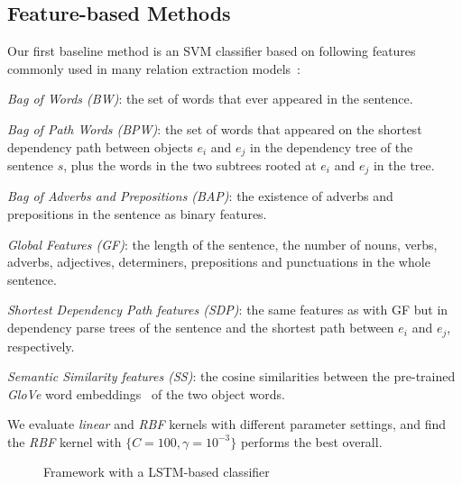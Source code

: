 \subsection{Feature-based Methods}
\label{sec:feature}
Our first baseline method is an SVM classifier based on following features commonly used in many relation extraction models~\cite{xu2015classifying}: 
\begin{compactenum}
	\item  \textit{Bag of Words (BW)}:
	the set of words that ever appeared in the sentence. 
	\item \textit{Bag of Path Words (BPW)}:
	the set of words that appeared on
	the shortest dependency path between objects $e_i$ and $e_j$ in the 
	dependency tree of the sentence $s$, plus the words in the two subtrees 
	rooted at $e_i$ and $e_j$ in the tree.
	\item \textit{Bag of Adverbs and Prepositions (BAP)}:
	the existence of adverbs and prepositions in the sentence as binary features. 
	\item \textit{Global Features (GF)}:
	the length of the sentence, the number of nouns, verbs, adverbs, adjectives, determiners, prepositions and punctuations in the whole sentence. 
	\item \textit{Shortest Dependency Path features (SDP)}:
	the same features as with GF but in dependency parse trees of the sentence and the shortest path 
	between $e_i$ and $e_j$, respectively. 
	\item \textit{Semantic Similarity features (SS)}:
	the cosine similarities between the pre-trained \textit{GloVe} word embeddings~\cite{pennington2014glove} of the two object words.
\end{compactenum}
We evaluate \textit{linear} and \textit{RBF} kernels with different parameter settings, and find the \textit{RBF} kernel with $\{C=100, \gamma=10^{-3}\}$ performs the best overall.

\begin{figure*}[t]
	\centering
	\caption{Framework with a LSTM-based classifier}
	\label{fig:LSTM}
\end{figure*}

